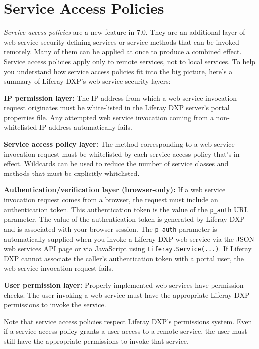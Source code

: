 \section{Service Access Policies}\label{service-access-policies}

\emph{Service access policies} are a new feature in 7.0. They are an
additional layer of web service security defining services or service
methods that can be invoked remotely. Many of them can be applied at
once to produce a combined effect. Service access policies apply only to
remote services, not to local services. To help you understand how
service access policies fit into the big picture, here's a summary of
Liferay DXP's web service security layers:

\textbf{IP permission layer:} The IP address from which a web service
invocation request originates must be white-listed in the Liferay DXP
server's portal properties file. Any attempted web service invocation
coming from a non-whitelisted IP address automatically fails.

\textbf{Service access policy layer:} The method corresponding to a web
service invocation request must be whitelisted by each service access
policy that's in effect. Wildcards can be used to reduce the number of
service classes and methods that must be explicitly whitelisted.

\textbf{Authentication/verification layer (browser-only):} If a web
service invocation request comes from a browser, the request must
include an authentication token. This authentication token is the value
of the \texttt{p\_auth} URL parameter. The value of the authentication
token is generated by Liferay DXP and is associated with your browser
session. The \texttt{p\_auth} parameter is automatically supplied when
you invoke a Liferay DXP web service via the JSON web services API page
or via JavaScript using \texttt{Liferay.Service(...)}. If Liferay DXP
cannot associate the caller's authentication token with a portal user,
the web service invocation request fails.

\textbf{User permission layer:} Properly implemented web services have
permission checks. The user invoking a web service must have the
appropriate Liferay DXP permissions to invoke the service.

Note that service access policies respect Liferay DXP's permissions
system. Even if a service access policy grants a user access to a remote
service, the user must still have the appropriate permissions to invoke
that service.

